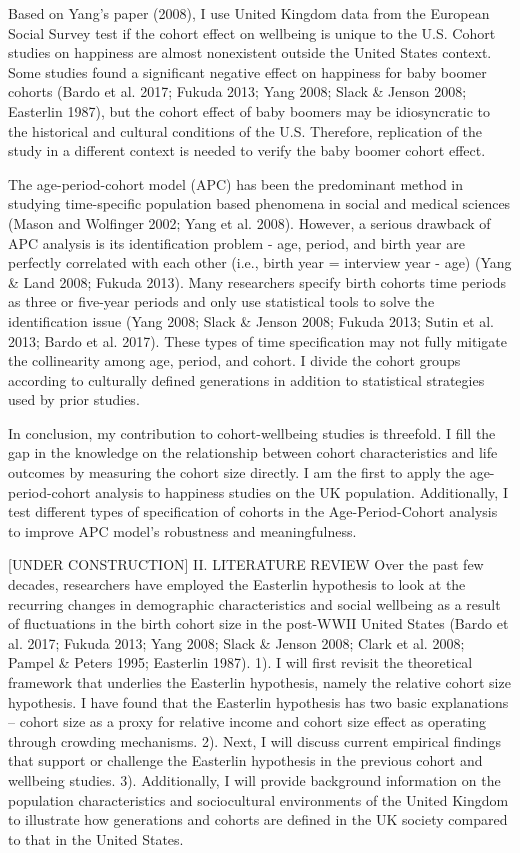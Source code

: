 Based on Yang’s paper (2008), I use United Kingdom data from the European Social Survey test if the cohort effect on wellbeing is unique to the U.S. Cohort studies on happiness are almost nonexistent outside the United States context. Some studies found a significant negative effect on happiness for baby boomer cohorts (Bardo et al. 2017; Fukuda 2013; Yang 2008; Slack & Jenson 2008; Easterlin 1987), but the cohort effect of baby boomers may be idiosyncratic to the historical and cultural conditions of the U.S. Therefore, replication of the study in a different context is needed to verify the baby boomer cohort effect.

The age-period-cohort model (APC) has been the predominant method in studying time-specific population based phenomena in social and medical sciences (Mason and Wolfinger 2002; Yang et al. 2008). However, a serious drawback of APC analysis is its identification problem - age, period, and birth year are perfectly correlated with each other (i.e., birth year = interview year - age) (Yang & Land 2008; Fukuda 2013). Many researchers specify birth cohorts time periods as three or five-year periods and only use statistical tools to solve the identification issue (Yang 2008; Slack & Jenson 2008; Fukuda 2013; Sutin et al. 2013; Bardo et al. 2017). These types of time specification may not fully mitigate the collinearity among age, period, and cohort. I divide the cohort groups according to culturally defined generations in addition to statistical strategies used by prior studies.

In conclusion, my contribution to cohort-wellbeing studies is threefold. I fill the gap in the knowledge on the relationship between cohort characteristics and life outcomes by measuring the cohort size directly. I am the first to apply the age-period-cohort analysis to happiness studies on the UK population. Additionally, I test different types of specification of cohorts in the Age-Period-Cohort analysis to improve APC model’s robustness and meaningfulness.

[UNDER CONSTRUCTION]
II. LITERATURE REVIEW
Over the past few decades, researchers have employed the Easterlin hypothesis to look at the recurring changes in demographic characteristics and social wellbeing as a result of fluctuations in the birth cohort size in the post-WWII United States (Bardo et al. 2017; Fukuda 2013; Yang 2008; Slack & Jenson 2008; Clark et al. 2008; Pampel & Peters 1995; Easterlin 1987). 1). I will first revisit the theoretical framework that underlies the Easterlin hypothesis, namely the relative cohort size hypothesis. I have found that the Easterlin hypothesis has two basic explanations – cohort size as a proxy for relative income and cohort size effect as operating through crowding mechanisms. 2). Next, I will discuss current empirical findings that support or challenge the Easterlin hypothesis in the previous cohort and wellbeing studies. 3). Additionally, I will provide background information on the population characteristics and sociocultural environments of the United Kingdom to illustrate how generations and cohorts are defined in the UK society compared to that in the United States.

